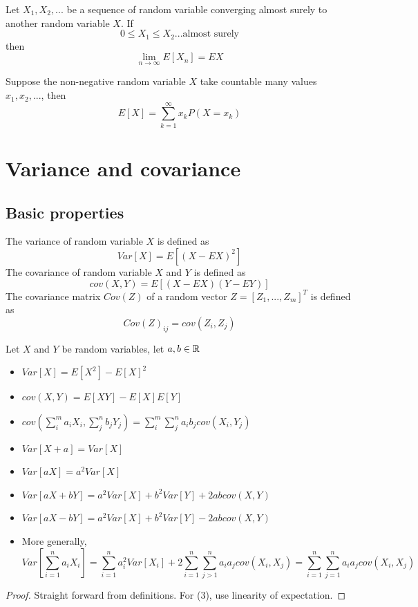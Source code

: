 \begin{refsection}
\begin{theorem}\cite[26]{shreve2004stochastic2}
Let $X_1,X_2,...$ be a sequence of random variable converging almost surely to another random variable $X$. If $$0\leq X_1 \leq X_2 ... \text{almost surely}$$
then
$$\lim_{n\to\infty} E[X_n] = EX$$
\end{theorem}

\begin{corollary}
Suppose the non-negative random variable $X$ take countable many values $x_1,x_2,...$, then
$$E[X] = \sum_{k=1}^\infty x_k P(X=x_k)$$
\end{corollary}


\section{Variance and covariance}
\subsection{Basic properties}

\begin{definition}
	The variance of random variable $X$ is defined as
	$$Var[X] = E[(X-EX)^2]$$	
	The covariance of random variable $X$ and $Y$ is defined as
	$$cov(X,Y) = E[(X-EX)(Y-EY)]$$
	The covariance matrix $Cov(Z)$ of a random vector $Z=[Z_1,...,Z_m]^T$ is defined as
	$$Cov(Z)_{ij} = cov(Z_i,Z_j)$$
\end{definition}


\begin{lemma}\label{ch:theory-of-probability:covarianceproperty}
	Let $X$ and $Y$ be random variables, let $a,b\in \mathbb{R}$
	\begin{itemize}
		\item $Var[X] = E[X^2] - E[X]^2$
		\item $cov(X,Y) = E[XY] - E[X]E[Y]$
		\item $cov(\sum_i^m a_iX_i,\sum_j^n b_jY_j) = \sum_i^m \sum_j^n a_ib_j cov(X_i,Y_j)$
		\item $Var[X+a] = Var[X]$
		\item $Var[aX] = a^2Var[X]$
		\item $Var[aX+bY] = a^2Var[X] +b^2Var[Y] + 2abcov(X,Y)$
		\item $Var[aX-bY] = a^2Var[X] +b^2Var[Y] - 2abcov(X,Y)$
		\item More generally, 
		$$Var[\sum_{i=1}^n a_iX_i] = \sum_{i=1}^n a_i^2 Var[X_i] + 2\sum_{i=1}^n\sum_{j>1}^n a_ia_j cov(X_i,X_j) = \sum_{i=1}^n\sum_{j=1}^n a_ia_j cov(X_i,X_j)$$
	\end{itemize}
\end{lemma}
\begin{proof}
	Straight forward from definitions. For (3), use linearity of expectation. 
\end{proof}


\end{refsection}
